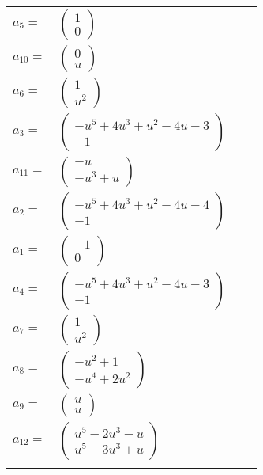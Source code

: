 \documentclass[1p]{elsarticle_modified}
\theoremstyle{definition}
\begin{document}
\begin{tabular}{m{7pt} m{180pt} m{7pt} m{180pt} }
\flushright $a_{5}=$&$\begin{pmatrix}1\\0\end{pmatrix}$ \\
\flushright $a_{10}=$&$\begin{pmatrix}0\\u\end{pmatrix}$ \\
\flushright $a_{6}=$&$\begin{pmatrix}1\\u^2\end{pmatrix}$ \\
\flushright $a_{3}=$&$\begin{pmatrix}- u^5+4 u^3+u^2-4 u-3\\-1\end{pmatrix}$ \\
\flushright $a_{11}=$&$\begin{pmatrix}- u\\- u^3+u\end{pmatrix}$ \\
\flushright $a_{2}=$&$\begin{pmatrix}- u^5+4 u^3+u^2-4 u-4\\-1\end{pmatrix}$ \\
\flushright $a_{1}=$&$\begin{pmatrix}-1\\0\end{pmatrix}$ \\
\flushright $a_{4}=$&$\begin{pmatrix}- u^5+4 u^3+u^2-4 u-3\\-1\end{pmatrix}$ \\
\flushright $a_{7}=$&$\begin{pmatrix}1\\u^2\end{pmatrix}$ \\
\flushright $a_{8}=$&$\begin{pmatrix}- u^2+1\\- u^4+2 u^2\end{pmatrix}$ \\
\flushright $a_{9}=$&$\begin{pmatrix}u\\u\end{pmatrix}$ \\
\flushright $a_{12}=$&$\begin{pmatrix}u^5-2 u^3- u\\u^5-3 u^3+u\end{pmatrix}$\\&\end{tabular}
\end{document}
